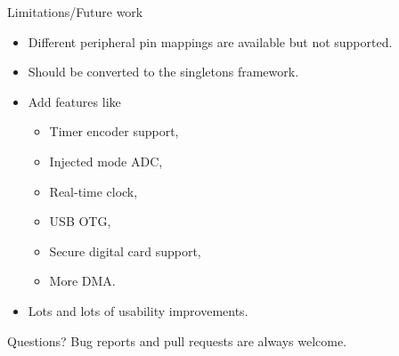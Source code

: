 \documentclass[
  aspectratio=169,
]{beamer}
\begin{document}
\begin{frame}{Limitations/Future work}
\begin{itemize}
\item Different peripheral \alert{pin mappings} are available but not supported.
\item Should be converted to the \alert{singletons} framework.
\item Add features like
	\begin{itemize}
	\item Timer encoder support,
	\item Injected mode ADC,
	\item Real-time clock,
	\item USB OTG,
	\item Secure digital card support,
	\item More DMA.
	\end{itemize}
\item Lots and lots of \alert{usability} improvements.
\end{itemize}
\end{frame}



\begin{frame}{Questions?}
Bug reports and pull requests are always welcome.
\end{frame}
\end{document}
